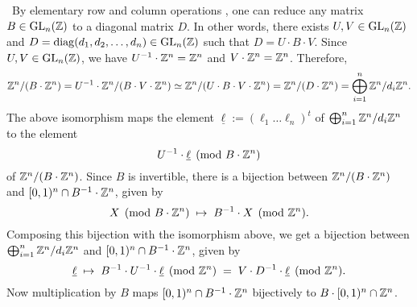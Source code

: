 \documentclass[a4paper,11pt]{amsart}
\begin{document}
\begin{minipage}{14cm}
 \ \quad By elementary row and column operations \cite{a}, one can reduce any matrix $B\in\operatorname{GL}_n(\mathbb{Z})$ to a diagonal matrix $D$. In other words,
there exists $U, V\in\operatorname{GL}_n(\mathbb{Z})$ and $D=\mathrm{diag}(d_1,d_2,\hdots,d_n)\in\operatorname{GL}_n(\mathbb{Z})$ such that $D=U\cdot B\cdot V$. 
Since $U,V\in \operatorname{GL}_n(\mathbb{Z})$,
we have $U^{-1}\cdot\mathbb{Z}^n=\mathbb{Z}^n$ and $V\cdot\mathbb{Z}^n=\mathbb{Z}^n$. Therefore,
$$\mathbb{Z}^n/(B\cdot \mathbb{Z}^n)=U^{-1}\cdot\mathbb{Z}^n/(B\cdot V\cdot\mathbb{Z}^n)\simeq\mathbb{Z}^n/(U\cdot B\cdot V\cdot\mathbb{Z}^n)=\mathbb{Z}^n/(D\cdot \mathbb{Z}^n)=\bigoplus_{i=1}^n\mathbb{Z}^n/d_i\mathbb{Z}^n.$$
The above isomorphism maps the element $\underline{\ell}:=(\ell_1\hdots\ell_n)^t$ \hspace{1pt}of\hspace{2pt} $\bigoplus_{i=1}^n\mathbb{Z}^n/d_i\mathbb{Z}^n$ to the element $$U^{-1}\cdot\underline{\ell}\pmod{B\cdot\mathbb{Z}^n}$$ of $\mathbb{Z}^n/(B\cdot \mathbb{Z}^n)$.
 Since $B$ is invertible, there is a bijection between $\mathbb{Z}^n/(B\cdot \mathbb{Z}^n)$ and \hspace{2pt}$[0,1)^n\cap B^{-1}\cdot\mathbb{Z}^n$, given by $$X\pmod{B\cdot\mathbb{Z}^n}\hspace{.1cm}\mapsto\hspace{.1cm} B^{-1}\cdot X\pmod{\mathbb{Z}^n}.$$
Composing this bijection with the isomorphism above, we get a bijection between \hspace{2pt}$\bigoplus_{i=1}^n\mathbb{Z}^n/d_i\mathbb{Z}^n$ and \hspace{2pt}$[0,1)^n\cap B^{-1}\cdot\mathbb{Z}^n$, given by 
$$\underline{\ell}\hspace{.1cm}\mapsto\hspace{.1cm} B^{-1}\cdot U^{-1}\cdot\underline{\ell}\pmod{\mathbb{Z}^n}\hspace{.1cm}=\hspace{.1cm}V\cdot D^{-1}\cdot\underline{\ell}\pmod{\mathbb{Z}^n}.$$
Now multiplication by $B$ maps \hspace{2pt}$[0,1)^n\cap B^{-1}\cdot\mathbb{Z}^n$ bijectively to $B\cdot[0,1)^n\cap \mathbb{Z}^n$.
\end{minipage}


\

\
\end{document}
